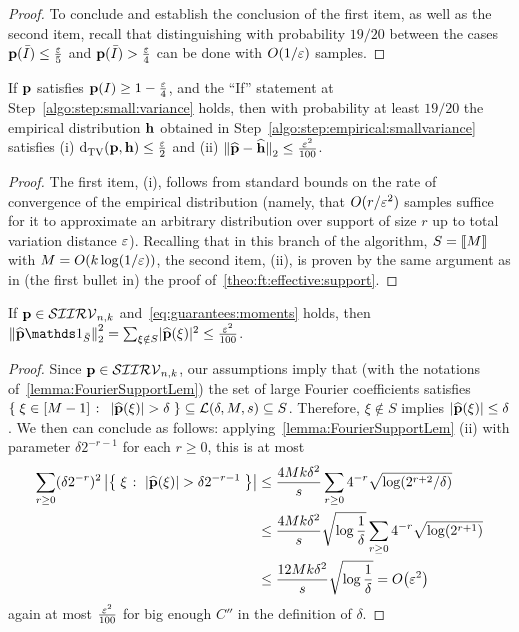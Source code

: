 \begin{proof}
To conclude and establish the conclusion of the first item, as well as the second item, recall that distinguishing with probability $19/20$ between the cases $\p(\bar{I})\leq\frac{\eps}{5}$ and $\p(\bar{I})>\frac{\eps}{4}$ can be done with $O(1/\eps)$ samples.
\end{proof}

\begin{claim}\label{claim:learn:empirical}
  If $\p$ satisfies $\p(I)\geq 1-\frac{\eps}{4}$, and the ``If'' statement at Step~\ref{algo:step:small:variance} holds, then with probability at least $19/20$ the empirical distribution $\h$ obtained in Step~\ref{algo:step:empirical:smallvariance} satisfies (i) $\totalvardist{\p}{\h} \leq \frac{\eps}{2}$ and (ii) $\normtwo{\fourier{\p}-\fourier{\h}} \leq \frac{\eps^2}{100}$.
\end{claim}
\begin{proof}The first item, (i), follows from standard bounds on the rate of convergence of the empirical distribution (namely, that $O(r/\eps^2)$ samples suffice for it to approximate an arbitrary distribution over support of size $r$ up to total variation distance $\eps$). Recalling that in this branch of the algorithm, $S=\modulo{M}$ with $M=O(k\log(1/\eps))$, the second item, (ii), is proven by the same argument as in (the first bullet in) the proof of~\cref{theo:ft:effective:support}.
\end{proof}

\begin{claim}\label{claim:ksiirv:fourier:concentrated}
  If $\p \in \classksiirv[n]{k}$ and~\eqref{eq:guarantees:moments} holds, then
  $
      \normtwo{\fourier{\p}\indicSet{\bar{S}}}^2 = \sum_{\xi\notin S} \dabs{\fourier{\p}(\xi)}^2 \leq \frac{\eps^2}{100}
  $.
\end{claim}
\begin{proof}Since $\p \in \classksiirv[n]{k}$, our assumptions imply that (with the notations of~\cref{lemma:FourierSupportLem}) the set of large Fourier coefficients satisfies $\setOfSuchThat{\xi\in[M-1]}{ \abs{\fourier{\p}(\xi)} > \delta } \subseteq \mathcal{L}(\delta, M, s)\subseteq S$. Therefore, $\xi\notin S$ implies $\dabs{\fourier{\p}(\xi)} \leq \delta$. We then can conclude as follows: applying~\cref{lemma:FourierSupportLem} (ii) with parameter $\delta 2^{-r-1}$ for each $r \geq 0$, this is at most
\begin{align}
\sum_{r\geq 0} (\delta 2^{-r})^2  \abs{\setOfSuchThat{ \xi }{ |\fourier{\p}(\xi)| > \delta 2^{-r-1} }} 
&\leq  \frac{4Mk \delta^2}{s} \sum_{r\geq 0} 4^{-r}\sqrt{\log(2^{r+2}/\delta)} \notag\\
& \leq \frac{4Mk \delta^2}{s} \sqrt{\log\frac{1}{\delta}} \sum_{r\geq 0} 4^{-r}\sqrt{\log(2^{r+1})} \notag\\
& \leq \frac{12Mk \delta^2}{s} \sqrt{\log\frac{1}{\delta}} = \bigO{\eps^2} \label{eq:dealing:small:coeffs:p}
\end{align}
again at most $\frac{\eps^2}{100}$ for big enough $C''$ in the definition of $\delta$.
\end{proof}


